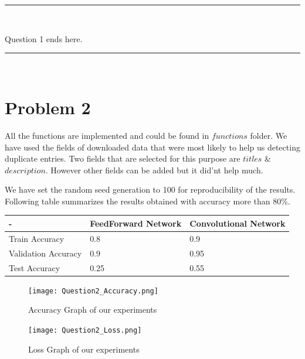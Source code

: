 \documentclass[paper=a4, fontsize=11pt]{scrartcl} %
\numberwithin{equation}{section} %
\numberwithin{figure}{section} %
\numberwithin{table}{section} %
\newcommand{\horrule}[1]{\rule{\linewidth}{#1}} %
\begin{document}
\horrule{0.5pt} \\
\begin{center}
Question 1 ends here.
\horrule{2pt} \\
\end{center}
\pagebreak



\section{Problem 2}

All the functions are implemented and could be found in $functions$ folder. We have used the fields of downloaded data that were most likely to help us detecting duplicate entries. Two fields that are selected for this purpose are $titles$ \& $description$. However other fields can be added but it did'nt help much.

We have set the random seed generation to 100 for reproducibility of the results. Following table summarizes the results obtained with accuracy more than 80\%.

\begin{center}
\begin{tabulary}{1\textwidth}{|L|L|L|}


\hline
\hline
- & FeedForward Network & Convolutional Network  \\ 
\hline
\hline
Train Accuracy & 0.8 & 0.9    \\
\hline
Validation Accuracy & 0.9 & 0.95 \\
\hline
Test Accuracy & 0.25 & 0.55  \\
\hline
\end{tabulary}
\end{center}

\begin{figure}[h]
\begin{center}
\texttt{[image: Question2\_Accuracy.png]}
\end{center}
\caption{Accuracy Graph of our experiments}
\label{fig:demo}
\end{figure}


\pagebreak


\begin{figure}[h]
\begin{center}
\texttt{[image: Question2\_Loss.png]}
\end{center}
\caption{Loss Graph of our experiments}
\label{fig:demo}
\end{figure}
\end{document}
